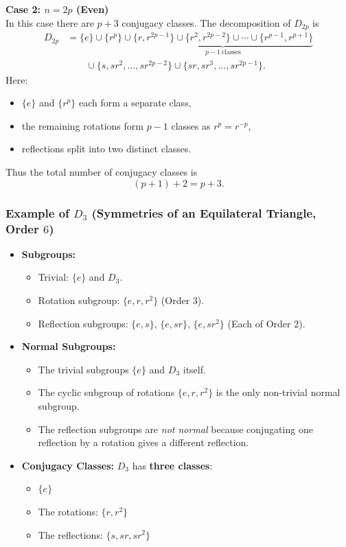 \documentclass[a4paper,12pt]{article}
\theoremstyle{definition}
\begin{document}
\noindent\textbf{Case 2: $n=2p$ (Even)} \\
In this case there are $p+3$ conjugacy classes. The decomposition of $D_{2p}$ is
\begin{equation*}
\begin{aligned}
D_{2p}
&=
\{e\}
\cup
\{r^p\}
\cup
\underbrace{
\{r,r^{2p-1}\}\cup
\{r^2,r^{2p-2}\}\cup
\cdots\cup
\{r^{p-1},r^{p+1}\}
}_{p-1\ \text{classes}}
\\
&\qquad\cup
\{s,sr^2,\dots,sr^{2p-2}\}
\cup
\{sr,sr^3,\dots,sr^{2p-1}\}.
\end{aligned}
\end{equation*}
Here:
\begin{itemize}
\item $\{e\}$ and $\{r^p\}$ each form a separate class,
\item the remaining rotations form $p-1$ classes as $r^p = r^{-p}$,
\item reflections split into two distinct classes.
\end{itemize}
Thus the total number of conjugacy classes is
\begin{equation*}
(p+1)+2=p+3.
\end{equation*}

\subsubsection*{Example of $D_3$ (Symmetries of an Equilateral Triangle, Order $6$)}

\begin{itemize}
\item \textbf{Subgroups:}
\begin{itemize}
\item Trivial: $\{e\}$ and $D_3$.
\item Rotation subgroup: $\{e, r, r^2\}$ (Order $3$).
\item Reflection subgroups: $\{e, s\}$, $\{e, sr\}$, $\{e, sr^2\}$ (Each of Order $2$).
\end{itemize}

\item \textbf{Normal Subgroups:}
\begin{itemize}
\item The trivial subgroups $\{e\}$ and $D_3$ itself.
\item The cyclic subgroup of rotations $\{e, r, r^2\}$ is the only non-trivial normal subgroup.
\item The reflection subgroups are \textit{not normal} because conjugating one reflection by a rotation gives a different reflection.
\end{itemize}

\item \textbf{Conjugacy Classes:} $D_3$ has \textbf{three classes}:
\begin{itemize}
\item $\{e\}$
\item The rotations: $\{r, r^2\}$
\item The reflections: $\{s, sr, sr^2\}$
\end{itemize}
\end{itemize}
\end{document}
